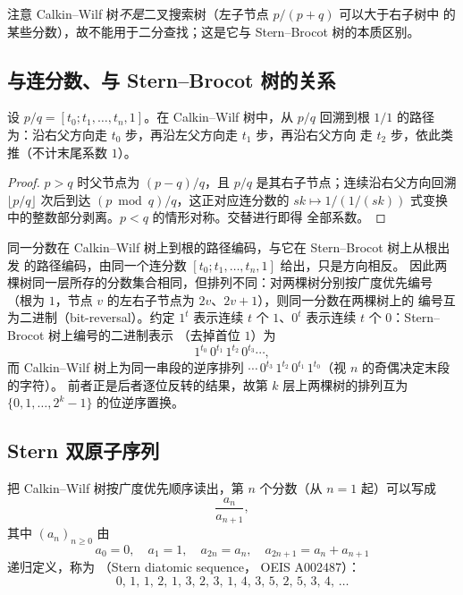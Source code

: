 注意 Calkin--Wilf 树\emph{不是}二叉搜索树（左子节点 $p/(p+q)$ 可以大于右子树中
的某些分数），故不能用于二分查找；这是它与 Stern--Brocot 树的本质区别。

\subsection{与连分数、与 Stern--Brocot 树的关系}

\begin{proposition}[回溯路径与连分数]\label{prop:cw-cf}
设 $p/q=[t_0;t_1,\ldots,t_n,1]$。在 Calkin--Wilf 树中，从 $p/q$ 回溯到根
$1/1$ 的路径为：沿右父方向走 $t_0$ 步，再沿左父方向走 $t_1$ 步，再沿右父方向
走 $t_2$ 步，依此类推（不计末尾系数 $1$）。
\end{proposition}

\begin{proof}
$p>q$ 时父节点为 $(p-q)/q$，且 $p/q$ 是其右子节点；连续沿右父方向回溯
$\lfloor p/q\rfloor$ 次后到达 $(p\bmod q)/q$，这正对应连分数的
$sk\mapsto 1/(1/(sk))$ 式变换中的整数部分剥离。$p<q$ 的情形对称。交替进行即得
全部系数。
\end{proof}

\begin{corollary}\label{cor:bit-reversal}
同一分数在 Calkin--Wilf 树上到根的路径编码，与它在 Stern--Brocot 树上从根出发
的路径编码，由同一个连分数 $[t_0;t_1,\ldots,t_n,1]$ 给出，只是方向相反。
因此两棵树同一层所存的分数集合相同，但排列不同：对两棵树分别按广度优先编号
（根为 $1$，节点 $v$ 的左右子节点为 $2v$、$2v+1$），则同一分数在两棵树上的
编号互为二进制（bit-reversal）。约定 $1^t$ 表示连续 $t$ 个
$1$、$0^t$ 表示连续 $t$ 个 $0$：Stern--Brocot 树上编号的二进制表示
（去掉首位 $1$）为
\[
  1^{t_0}\,0^{t_1}\,1^{t_2}\,0^{t_3}\cdots,
\]
而 Calkin--Wilf 树上为同一串段的逆序排列
$\cdots\,0^{t_3}\,1^{t_2}\,0^{t_1}\,1^{t_0}$（视 $n$ 的奇偶决定末段的字符）。
前者正是后者逐位反转的结果，故第 $k$ 层上两棵树的排列互为
$\{0,1,\ldots,2^k-1\}$ 的位逆序置换。
\end{corollary}

\subsection{Stern 双原子序列}

\begin{definition}
把 Calkin--Wilf 树按广度优先顺序读出，第 $n$ 个分数（从 $n=1$ 起）可以写成
\[
  \frac{a_n}{a_{n+1}},
\]
其中 $(a_n)_{n\ge0}$ 由
\[
  a_0=0,\quad a_1=1,\quad a_{2n}=a_n,\quad a_{2n+1}=a_n+a_{n+1}
\]
递归定义，称为 （Stern diatomic sequence，
OEIS A002487）：
\[
  0,\,1,\,1,\,2,\,1,\,3,\,2,\,3,\,1,\,4,\,3,\,5,\,2,\,5,\,3,\,4,\,\ldots
\]
\end{definition}

